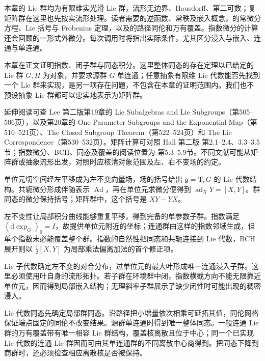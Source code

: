 \ProseParagraphBreak

本章的 Lie 群均为有限维实光滑 Lie 群，流形无边界、Hausdorff、第二可数；复矩阵群在这里也先按实流形处理。读者需要的逆函数、常秩及嵌入概念，的常微分方程、Lie 括号与 Frobenius 定理，以及的路径同伦和万有覆盖。指数微分的计算还会回顾的一形式外微分。每次调用时将指出实际条件，尤其区分浸入与嵌入、连通与单连通。

\ProseParagraphBreak

本章在正文证明指数、闭子群与同态积分。这里整体同态的存在定理以已给定的 Lie 群 \(G,H\) 为对象，并要求源群 \(G\) 单连通；任意抽象有限维 Lie 代数能否先找到一个 Lie 群来实现，是另一项存在问题，不包含在本章的证明范围内。我们也不预设抽象 Lie 群都可以忠实地表示为矩阵群。

\ProseParagraphBreak

延伸阅读可查 Lee 第二版第19章的 Lie Subalgebras and Lie Subgroups（第505--506页），以及第20章的 One-Parameter Subgroups and the Exponential Map（第516--521页）、The Closed Subgroup Theorem（第522--524页）和 The Lie Correspondence（第530--532页）\cite[第505--506、516--524、530--532页]{Lee2012Smooth}。矩阵计算可对照 Hall 第二版 第2.1--2.4、3.3--3.5节；指数微分、BCH、同态及覆盖的阅读位置为 第5.3--5.9节\cite[第2.1--2.4、3.3--3.5、5.3--5.9节]{Hall2015}。不同文献可能从矩阵群或抽象流形出发，对照时应核清对象范围及左、右不变场的约定。






\begin{chaptersummary}
	单位元切空间经左平移成为左不变向量场，场的括号给出 \(\mathfrak g=\mathrm{T}_eG\) 的 Lie 代数结构。共轭微分形成伴随表示 \(\operatorname{Ad}\)，再在单位元求微分便得到 \(\operatorname{ad}_XY=[X,Y]\)。群同态的微分保持括号；矩阵群中，这个括号是 \(XY-YX\)。

	\ProseParagraphBreak

	左不变性让局部积分曲线能够重复平移，得到完备的单参数子群。指数满足 \((\mathrm{d}\exp_G)_0=I\)，故提供单位元附近的坐标；连通群由这样的指数邻域生成，但单个指数未必能覆盖整个群。指数的自然性把同态和共轭连接到 Lie 代数，BCH 展开则以 \(\tfrac12[X,Y]\) 为局部乘法偏离加法的首个修正项。

	\ProseParagraphBreak

	Lie 子代数确定左不变的对合分布，过单位元的最大叶形成唯一连通浸入子群。这里必须使用叶自身的流形拓扑。若子群在环境群中闭，指数横截方向不能无限靠近单位元，因而得到局部嵌入结构；无理斜率子群展示了缺少闭性时可能出现的稠密浸入。

	\ProseParagraphBreak

	Lie 代数同态先确定局部群同态。沿路径把小增量依次相乘可延拓其值，同伦网格保证端点固定的同伦不改变结果。源群单连通时得到唯一整体同态。一般连通 Lie 群的万有覆盖带有唯一相容 Lie 群结构，覆盖核离散且位于中心；同一个已实现 Lie 代数的连通 Lie 群因而可由其单连通群的不同离散中心商得到。把同态下降到商群时，还必须检查相应离散核是否被保持。
\end{chaptersummary}

